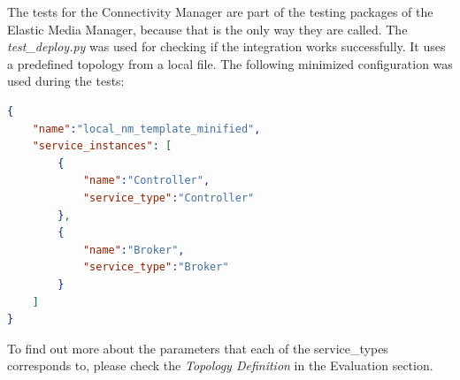 The tests for the Connectivity Manager are part of the testing packages of the Elastic Media Manager, because that is the only way they are called. The \textit{test\_deploy.py} was used for checking if the integration works successfully.  It uses a predefined topology from a local file. The following minimized configuration was used during the tests:
\begin{lstlisting}[language=json]
{
    "name":"local_nm_template_minified",
    "service_instances": [
        {
            "name":"Controller",
            "service_type":"Controller"
        },
        {
            "name":"Broker",
            "service_type":"Broker"
        }
    ]
}
\end{lstlisting}

To find out more about the parameters that each of the service\_types corresponds to, please check the \textit{Topology Definition} %
in the Evaluation section.